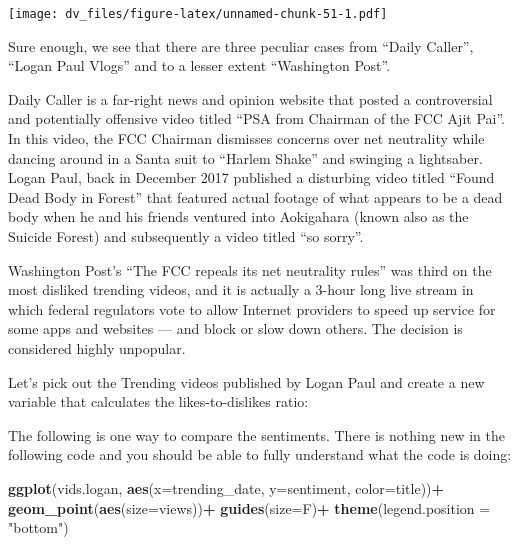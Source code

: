 \documentclass[]{article}
\newenvironment{Shaded}{\begin{snugshade}}{\end{snugshade}}
\newcommand{\DataTypeTok}[1]{\textcolor[rgb]{0.13,0.29,0.53}{#1}}
\newcommand{\DecValTok}[1]{\textcolor[rgb]{0.00,0.00,0.81}{#1}}
\newcommand{\KeywordTok}[1]{\textcolor[rgb]{0.13,0.29,0.53}{\textbf{#1}}}
\newcommand{\NormalTok}[1]{#1}
\newcommand{\OperatorTok}[1]{\textcolor[rgb]{0.81,0.36,0.00}{\textbf{#1}}}
\newcommand{\StringTok}[1]{\textcolor[rgb]{0.31,0.60,0.02}{#1}}
\begin{document}
\texttt{[image: dv\_files/figure-latex/unnamed-chunk-51-1.pdf]}

Sure enough, we see that there are three peculiar cases from ``Daily
Caller'', ``Logan Paul Vlogs'' and to a lesser extent ``Washington
Post''.

Daily Caller is a far-right news and opinion website that posted a
controversial and potentially offensive video titled ``PSA from Chairman
of the FCC Ajit Pai''. In this video, the FCC Chairman dismisses
concerns over net neutrality while dancing around in a Santa suit to
``Harlem Shake'' and swinging a lightsaber. Logan Paul, back in December
2017 published a disturbing video titled ``Found Dead Body in Forest''
that featured actual footage of what appears to be a dead body when he
and his friends ventured into Aokigahara (known also as the Suicide
Forest) and subsequently a video titled ``so sorry''.

Washington Post's ``The FCC repeals its net neutrality rules'' was third
on the most disliked trending videos, and it is actually a 3-hour long
live stream in which federal regulators vote to allow Internet providers
to speed up service for some apps and websites --- and block or slow
down others. The decision is considered highly unpopular.

Let's pick out the Trending videos published by Logan Paul and create a
new variable that calculates the likes-to-dislikes ratio:

\begin{Shaded}
\end{Shaded}

The following is one way to compare the sentiments. There is nothing new
in the following code and you should be able to fully understand what
the code is doing:

\begin{Shaded}
\begin{Highlighting}[]
\KeywordTok{ggplot}\NormalTok{(vids.logan, }\KeywordTok{aes}\NormalTok{(}\DataTypeTok{x=}\NormalTok{trending_date, }\DataTypeTok{y=}\NormalTok{sentiment, }\DataTypeTok{color=}\NormalTok{title))}\OperatorTok{+}
\StringTok{  }\KeywordTok{geom_point}\NormalTok{(}\KeywordTok{aes}\NormalTok{(}\DataTypeTok{size=}\NormalTok{views))}\OperatorTok{+}
\StringTok{  }\KeywordTok{guides}\NormalTok{(}\DataTypeTok{size=}\NormalTok{F)}\OperatorTok{+}
\StringTok{  }\KeywordTok{theme}\NormalTok{(}\DataTypeTok{legend.position =} \StringTok{"bottom"}\NormalTok{)}
\end{Highlighting}
\end{Shaded}
\end{document}
